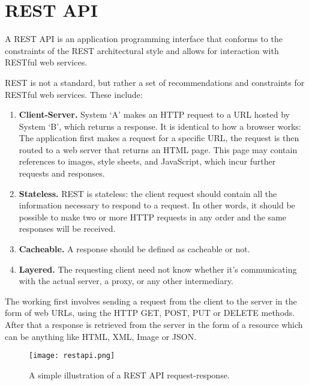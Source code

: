 \section{REST API}

A REST API is an application programming interface that conforms to the constraints of the REST 
architectural style and allows for interaction with RESTful web services.

REST is not a standard, but rather a set of recommendations and constraints for 
RESTful web services. These include:

\begin{enumerate}
    \item \textbf{Client-Server.} System ‘A’ makes an HTTP request to a URL hosted by 
    System ‘B’, which returns a response.
    It is identical to how a browser works: The application first makes a request 
    for a specific URL, the request is then routed to a web server that returns an HTML page. 
    This page may contain references to images, style sheets, and JavaScript, 
    which incur further requests and responses.

    \item \textbf{Stateless.} REST is stateless: the client request should contain all the 
    information necessary to respond to a request. In other words, it should be possible to
    make two or more HTTP requests in any order and the same responses will be received.

    \item \textbf{Cacheable.} A response should be defined as cacheable or not.
    
    \item \textbf{Layered.} The requesting client need not know whether it’s communicating 
    with the actual server, a proxy, or any other intermediary.~\cite{DevelopersRestAPI}
\end{enumerate}

The working first involves sending a request from the client to the server in the form of web URLs, 
using the HTTP GET, POST, PUT or DELETE methods. After that a response is retrieved from the server 
in the form of a resource which can be anything like HTML, XML, Image or JSON.~\cite{WhatisRESTAPI}

\begin{figure}
    \begin{center}
        \texttt{[image: restapi.png]}
    \end{center}
    \caption{A simple illustration of a REST API request-response.}
    \label{fig:restapi}
\end{figure}

